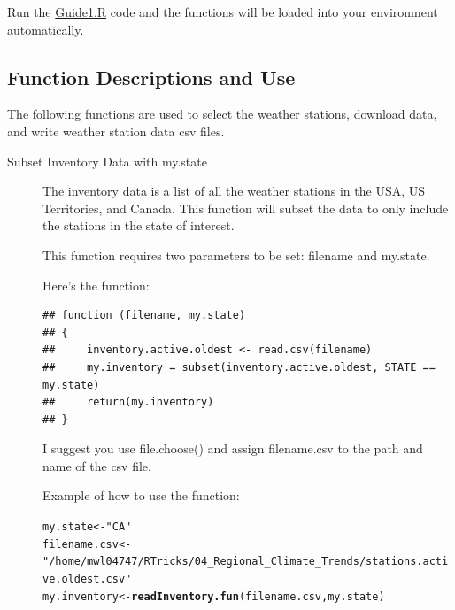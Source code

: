 \documentclass{article}\usepackage[]{graphicx}\usepackage[]{xcolor}
\makeatletter
\newcommand{\hlstr}[1]{\textcolor[rgb]{0.192,0.494,0.8}{#1}}%
\newcommand{\hlstd}[1]{\textcolor[rgb]{0.345,0.345,0.345}{#1}}%
\newcommand{\hlkwb}[1]{\textcolor[rgb]{0.69,0.353,0.396}{#1}}%
\newcommand{\hlkwd}[1]{\textcolor[rgb]{0.737,0.353,0.396}{\textbf{#1}}}%
\newenvironment{kframe}{%
 \def\at@end@of@kframe{}%
 \ifinner\ifhmode%
  \def\at@end@of@kframe{\end{minipage}}%
  \begin{minipage}{\columnwidth}%
 \fi\fi%
 \def\FrameCommand##1{\hskip\@totalleftmargin \hskip-\fboxsep
 \colorbox{shadecolor}{##1}\hskip-\fboxsep
     \hskip-\linewidth \hskip-\@totalleftmargin \hskip\columnwidth}%
 \MakeFramed {\advance\hsize-\width
   \@totalleftmargin\z@ \linewidth\hsize
   \@setminipage}}%
 {\par\unskip\endMakeFramed%
 \at@end@of@kframe}
\newenvironment{knitrout}{}{} %
\makeatother
\begin{document}
Run the \href{https://github.com/marclos/RTricks/blob/master/04_Regional_Climate_Trends/Guides/Guide1.R}{Guide1.R} code and the functions will be loaded into your environment automatically.

\subsection{Function Descriptions and Use}

The following functions are used to select the weather stations, download data, and write weather station data csv files.

\begin{description}

\item[Subset Inventory Data with my.state]  The inventory data is a list of all the weather stations in the USA, US Territories, and Canada. This function will subset the data to only include the stations in the state of interest.

This function requires two parameters to be set: filename and my.state. 

Here's the function:

\begin{knitrout}
\color{fgcolor}\begin{kframe}
\begin{verbatim}
## function (filename, my.state) 
## {
##     inventory.active.oldest <- read.csv(filename)
##     my.inventory = subset(inventory.active.oldest, STATE == my.state)
##     return(my.inventory)
## }
\end{verbatim}
\end{kframe}
\end{knitrout}

I suggest you use file.choose() and assign filename.csv to the path and name of the csv file. 

Example of how to use the function:

\begin{knitrout}
\color{fgcolor}\begin{kframe}
\begin{alltt}
\hlstd{my.state} \hlkwb{<-} \hlstr{"CA"}
\hlstd{filename.csv} \hlkwb{<-} \hlstr{"/home/mwl04747/RTricks/04_Regional_Climate_Trends/stations.active.oldest.csv"}
\hlstd{my.inventory} \hlkwb{<-} \hlkwd{readInventory.fun}\hlstd{(filename.csv, my.state)}
\end{alltt}
\end{kframe}
\end{knitrout}


\end{description}
\end{document}
